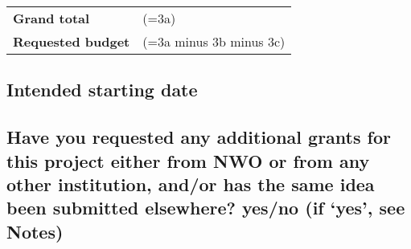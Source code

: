 \begin{table}[h!]
\begin{tabular}{p{9em}p{30em}}
\hline\hline
\cellcolor[gray]{0.7}\T\B\textbf{Grand total}&  (=3a)\\
\cellcolor[gray]{0.7}\T\B\textbf{Requested budget}& (=3a minus 3b minus 3c)\\
\hline\hline
\end{tabular}
\end{table}

\subsection{Intended starting date}


\subsection{Have you requested any additional grants for this project either
from NWO or from any other institution, and/or has the same idea been submitted
elsewhere? {\normalfont yes/no (if `yes', see Notes)}}


